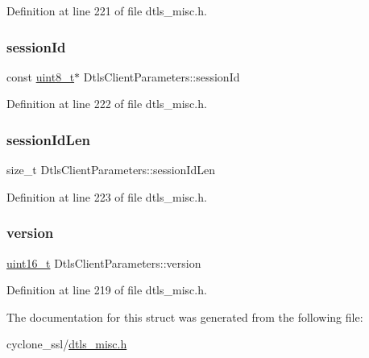 Definition at line 221 of file dtls\+\_\+misc.\+h.

\mbox{\label{structDtlsClientParameters_a6671f99ef473de11b1b7c1b76e8e2cb8}} 
\subsubsection{\texorpdfstring{session\+Id}{sessionId}}
{\footnotesize\ttfamily const \hyperlink{stdint_8h_aba7bc1797add20fe3efdf37ced1182c5}{uint8\+\_\+t}$\ast$ Dtls\+Client\+Parameters\+::session\+Id}



Definition at line 222 of file dtls\+\_\+misc.\+h.

\mbox{\label{structDtlsClientParameters_aca04db05a88059730c97a3dcc25705c0}} 
\subsubsection{\texorpdfstring{session\+Id\+Len}{sessionIdLen}}
{\footnotesize\ttfamily size\+\_\+t Dtls\+Client\+Parameters\+::session\+Id\+Len}



Definition at line 223 of file dtls\+\_\+misc.\+h.

\mbox{\label{structDtlsClientParameters_a76502088d967b0f240e8804b585e019a}} 
\subsubsection{\texorpdfstring{version}{version}}
{\footnotesize\ttfamily \hyperlink{stdint_8h_a273cf69d639a59973b6019625df33e30}{uint16\+\_\+t} Dtls\+Client\+Parameters\+::version}



Definition at line 219 of file dtls\+\_\+misc.\+h.



The documentation for this struct was generated from the following file\+:\begin{DoxyCompactItemize}
\item 
cyclone\+\_\+ssl/\hyperlink{dtls__misc_8h}{dtls\+\_\+misc.\+h}\end{DoxyCompactItemize}

